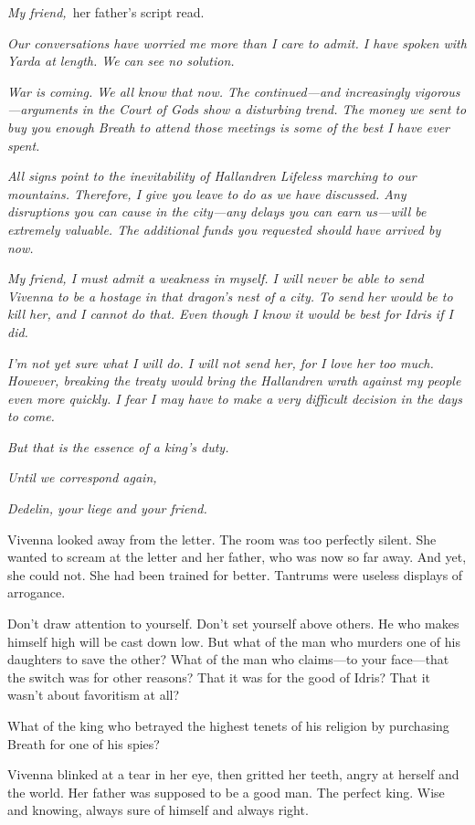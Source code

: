 \textit{My friend,}~her father’s script read.

\textit{Our conversations have worried me more than I care to admit. I have spoken with Yarda at length. We can see no solution.}

\textit{War is coming. We all know that now. The continued—and increasingly vigorous—arguments in the Court of Gods show a disturbing trend. The money we sent to buy you enough Breath to attend those meetings is some of the best I have ever spent.}

\textit{All signs point to the inevitability of Hallandren Lifeless marching to our mountains. Therefore, I give you leave to do as we have discussed. Any disruptions you can cause in the city—any delays you can earn us—will be extremely valuable. The additional funds you requested should have arrived by now.}

\textit{My friend, I must admit a weakness in myself. I will never be able to send Vivenna to be a hostage in that dragon’s nest of a city. To send her would be to kill her, and I cannot do that. Even though I know it would be best for Idris if I did.}

\textit{I’m not yet sure what I will do. I will not send her, for I love her too much. However, breaking the treaty would bring the Hallandren wrath against my people even more quickly. I fear I may have to make a very difficult decision in the days to come.}

\textit{But that is the essence of a king’s duty.}

\textit{Until we correspond again,}

\textit{Dedelin, your liege and your friend.}

Vivenna looked away from the letter. The room was too perfectly silent. She wanted to scream at the letter and her father, who was now so far away. And yet, she could not. She had been trained for better. Tantrums were useless displays of arrogance.

Don’t draw attention to yourself. Don’t set yourself above others. He who makes himself high will be cast down low. But what of the man who murders one of his daughters to save the other? What of the man who claims—to your face—that the switch was for other reasons? That it was for the good of Idris? That it wasn’t about favoritism at all?

What of the king who betrayed the highest tenets of his religion by purchasing Breath for one of his spies?

Vivenna blinked at a tear in her eye, then gritted her teeth, angry at herself and the world. Her father was supposed to be a good man. The perfect king. Wise and knowing, always sure of himself and always right.

